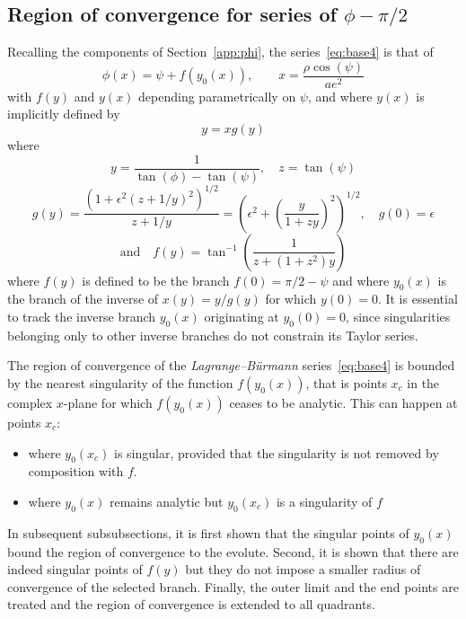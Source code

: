 \documentclass[a4paper]{amsart}
\begin{document}
\subsection{Region of convergence for series of \texorpdfstring{$\phi-\pi/2$}{φ - π/2}}
Recalling the components of Section~\ref{app:phi}, the series~\eqref{eq:base4} is that of
\begin{equation*}
\phi(x)=\psi+f(y_0(x)),
\qquad x=\frac{\rho\cos(\psi)}{ae^2}
\end{equation*}
with $f(y)$ and $y(x)$ depending parametrically on $\psi$, and where $y(x)$ is implicitly defined by
\begin{equation*}
y=xg(y)
\end{equation*}
where
\begin{equation*}
y=\frac{1}{\tan(\phi) - \tan(\psi)},\quad z = \tan(\psi)
\end{equation*}
\begin{equation*}
g(y)=\frac{(1 + \epsilon^2(z+1/y)^2)^{1/2}}{z + 1/y}
=\left(\epsilon^2+\left(\frac{y}{1+zy}\right)^2\right)^{1/2},\quad g(0)=\epsilon
\end{equation*}
\begin{equation*}
\text{and}\quad f(y)=\tan^{-1}\left(\frac{1}{z +(1+z^2)y}\right)
\end{equation*}
where $f(y)$ is defined to be the branch $f(0)=\pi/2-\psi$ and where $y_0(x)$ is the branch of the inverse of $x(y)=y/g(y)$ for which $y(0)=0$. It is essential to track the inverse branch $y_0(x)$ originating at $y_0(0)=0$, since singularities belonging only to other inverse branches do not constrain its Taylor series.


The region of convergence of the \emph{Lagrange–B\"urmann} series~\eqref{eq:base4} is bounded by the nearest singularity of the function $f(y_0(x))$, that is points $x_c$ in the complex $x$-plane for which $f(y_0(x))$ ceases to be analytic. This can happen at points $x_c$:
\begin{itemize}
\item where $y_0(x_c)$ is singular, provided that
the singularity is not removed by composition with $f$.
\item where $y_0(x)$ remains analytic but $y_0(x_c)$ is a singularity of $f$
\end{itemize}
In subsequent subsubsections, it is first shown that the singular points of $y_0(x)$ bound the region of convergence to the evolute. Second, it is shown that there are indeed singular points of $f(y)$ but they do not impose a smaller radius of convergence of the selected branch.
Finally, the outer limit and the end points are treated and the region of convergence is extended to all quadrants.
\end{document}
